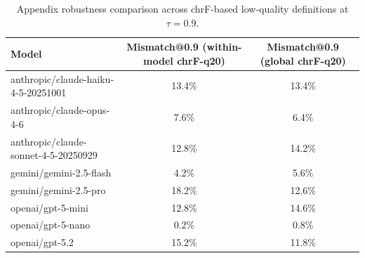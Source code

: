 \begin{table}[t]
\centering
\small
\begin{tabular}{lcc}
\toprule
Model & Mismatch@0.9 (within-model chrF-q20) & Mismatch@0.9 (global chrF-q20) \\
\midrule
anthropic/claude-haiku-4-5-20251001 & 13.4\% & 13.4\% \\
anthropic/claude-opus-4-6 & 7.6\% & 6.4\% \\
anthropic/claude-sonnet-4-5-20250929 & 12.8\% & 14.2\% \\
gemini/gemini-2.5-flash & 4.2\% & 5.6\% \\
gemini/gemini-2.5-pro & 18.2\% & 12.6\% \\
openai/gpt-5-mini & 12.8\% & 14.6\% \\
openai/gpt-5-nano & 0.2\% & 0.8\% \\
openai/gpt-5.2 & 15.2\% & 11.8\% \\
\bottomrule
\end{tabular}
\caption{Appendix robustness comparison across chrF-based low-quality definitions at $\tau=0.9$.}
\label{tab:robustness}
\end{table}
